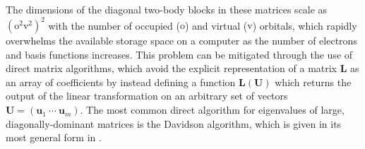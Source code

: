 The dimensions of the diagonal two-body blocks in these matrices scale as
\((\mathrm{o}^2\mathrm{v}^2)^2\) with the number of occupied (\(\mathrm{o}\))
and virtual (\(\mathrm{v}\)) orbitals, which rapidly overwhelms the available
storage space on a computer as the number of electrons and basis functions
increases.
This problem can be mitigated through the use of direct matrix algorithms, which
avoid the explicit representation of a matrix \(\mathbf{L}\) as an array of
coefficients by instead defining a function \(\mathbf{L}(\mathbf{U})\) which
returns the output of the linear transformation on an arbitrary set of vectors
\(\mathbf{U}=(\mathbf{u}_1\ \cdots\ \mathbf{u}_m)\).
The most common direct algorithm for eigenvalues of large, diagonally-dominant
matrices is the Davidson algorithm, which is given in its most general form in
.

